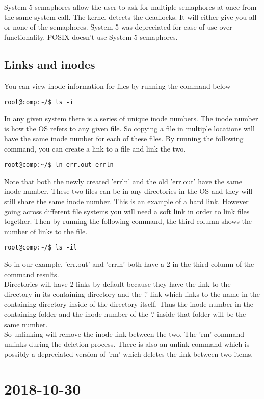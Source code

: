 \documentclass{report}
\newcommand{\mychapter}[2]{
	\setcounter{chapter}{#1}
	\setcounter{section}{0}
	\chapter*{#2}
	\addcontentsline{toc}{chapter}{#2}
}
\begin{document}
System 5 semaphores allow the user to ask for multiple semaphores at once from the same system call. The kernel detects the deadlocks. It will either give you all or none of the semaphores. System 5 was depreciated for ease of use over functionality. POSIX doesn't use System 5 semaphores.\\

\section{Links and inodes}
You can view inode information for files by running the command below

\begin{verbatim}
root@comp:~/$ ls -i
\end{verbatim}

In any given system there is a series of unique inode numbers. The inode number is how the OS refers to any given file. So copying a file in multiple locations will have the same inode number for each of these files. By running the following command, you can create a link to a file and link the two.

\begin{verbatim}
root@comp:~/$ ln err.out errln
\end{verbatim}

Note that both the newly created 'errln' and the old 'err.out' have the same inode number. These two files can be in any directories in the OS and they will still share the same inode number. This is an example of a hard link. However going across different file systems you will need a soft link in order to link files together. Then by running the following command, the third column shows the number of links to the file.

\begin{verbatim}
root@comp:~/$ ls -il
\end{verbatim}

So in our example, 'err.out' and 'errln' both have a 2 in the third column of the command results.\\

Directories will have 2 links by default because they have the link to the directory in its containing directory and the '.' link which links to the name in the containing directory inside of the directory itself. Thus the inode number in the containing folder and the inode number of the '.' inside that folder will be the same number.\\

So unlinking will remove the inode link between the two. The 'rm' command unlinks during the deletion process. There is also an unlink command which is possibly a depreciated version of 'rm' which deletes the link between two items.\\



\mychapter{7}{2018-10-30}
\end{document}
